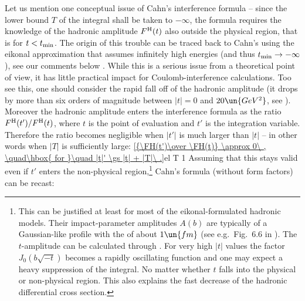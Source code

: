 
Let us mention one conceptual issue of Cahn's interference formula  -- since the lower bound $T$ of the integral shall be taken to $-\infty$, the formula requires the knowledge of the hadronic amplitude $F^{\rm H}(t)$ also outside the physical region, that is for $t < t_{\rm min}$. The origin of this trouble can be traced back to Cahn's using the eikonal approximation that assumes infinitely high energies (and thus $t_{\rm min} \to -\infty$), see our comments below . While this is a serious issue from a theoretical point of view,  it has little practical impact for Coulomb-interference calculations. Too see this, one should consider the rapid fall off of the hadronic amplitude (it drops by more than six orders of magnitude between $|t|=0$ and $20\un{GeV^2}$, see ). Moreover the hadronic amplitude enters the interference formula  as the ratio $F^{\rm H}(t') / F^{\rm H}(t)$, where $t$ is the point of evaluation and $t'$ is the integration variable. Therefore the ratio becomes negligible when $|t'|$ is much larger than $|t|$ -- in other words when $|T|$ is sufficiently large:
\eqref{{\FH(t')\over \FH(t)} \approx 0\ , \quad\hbox{ for }\quad |t|' \gs |t| + |T|\ .}{el T 1}
Assuming that this stays valid even if $t'$ enters the non-physical region,\footnote{%
This can be justified at least for most of the eikonal-formulated hadronic models. Their impact-parameter amplitudes $A(b)$ are typically of a Gaussian-like profile with the  of about $1\un{fm}$ (see e.g.~Fig.~6.6 in ). The $t$-amplitude can be calculated through . For very high $|t|$ values the factor $J_0(b\sqrt{-t})$ becomes a rapidly oscillating function and one may expect a heavy suppression of the integral. No matter whether $t$ falls into the physical or non-physical region. This also explains the fast decrease of the hadronic differential cross section. 
} Cahn's formula  (without form factors) can be recast:
